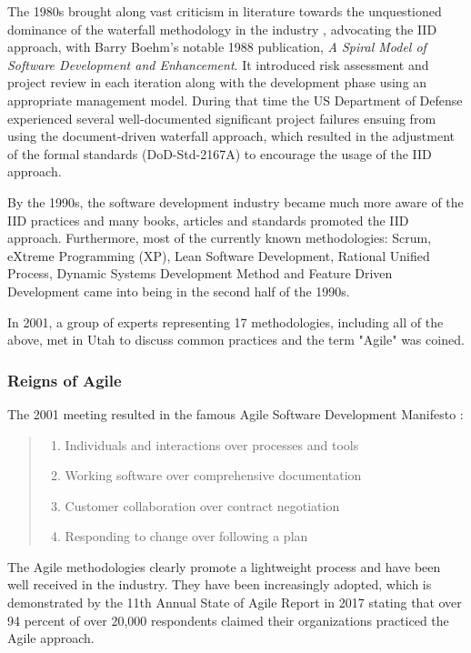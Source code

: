 \documentclass{article}
\begin{document}
The 1980s brought along vast criticism in literature towards the unquestioned dominance of the waterfall methodology in the industry \citep{larman2003iterative}, advocating the IID approach, with Barry Boehm's notable 1988 publication, \textit{A Spiral Model of Software Development and Enhancement}. It introduced risk assessment and project review in each iteration along with the development phase using an appropriate management model. During that time the US Department of Defense experienced several well-documented significant project failures ensuing from using the document-driven waterfall approach, which resulted in the adjustment of the formal standards (DoD-Std-2167A) to encourage the usage of the IID approach.

By the 1990s, the software development industry became much more aware of the IID practices and many books, articles and standards promoted the IID approach. Furthermore, most of the currently known methodologies: Scrum, eXtreme Programming (XP), Lean Software Development, Rational Unified Process, Dynamic Systems Development Method and Feature Driven Development came into being in the second half of the 1990s.

In 2001, a group of experts representing 17 methodologies, including all of the above, met in Utah to discuss common practices and the term "Agile" was coined.

\subsubsection{Reigns of Agile}

The 2001 meeting resulted in the famous Agile Software Development Manifesto \citep{beck2001Agile}:
\begin{quote}
\begin{enumerate}
  \item Individuals and interactions over processes and tools
  \item Working software over comprehensive documentation
  \item Customer collaboration over contract negotiation
  \item Responding to change over following a plan
\end{enumerate}
\end{quote}

The Agile methodologies clearly promote a lightweight process and have been well received in the industry. They have been increasingly adopted, which is demonstrated by the 11th Annual State of Agile Report in 2017 \citep{one201711th} stating that over 94 percent of over 20,000 respondents claimed their organizations practiced the Agile approach.
\end{document}
